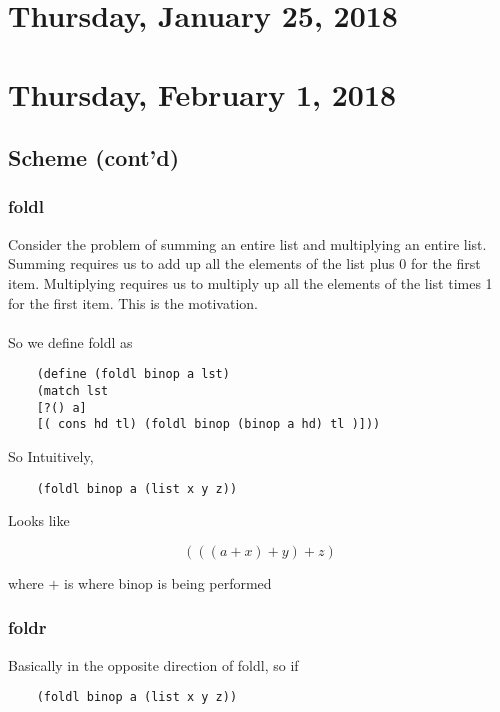 \documentclass[12pt]{article}
\begin{document}
\section{Thursday, January 25, 2018}



\newpage

\section{Thursday, February 1, 2018}

\subsection{Scheme (cont'd)}

\subsubsection{foldl}

Consider the problem of summing an entire list and multiplying an entire list. Summing requires us to add up all the elements of the list plus 0 for the first item. Multiplying requires us to multiply up all the elements of the list times 1 for the first item. This is the motivation.\\
\\
So we define foldl as

\begin{lstlisting}
    (define (foldl binop a lst)
	(match lst
	[?() a]
	[( cons hd tl) (foldl binop (binop a hd) tl )]))
\end{lstlisting}

So Intuitively, 

\begin{lstlisting}
	(foldl binop a (list x y z))
\end{lstlisting}

Looks like

$$(((a + x) + y) + z)$$

where $+$ is where binop is being performed

\subsubsection{foldr}

Basically in the opposite direction of foldl, so if

\begin{lstlisting}
	(foldl binop a (list x y z))
\end{lstlisting}
\end{document}
